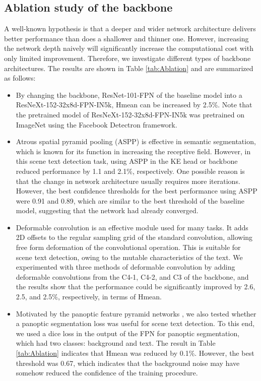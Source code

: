 \subsection{Ablation study of the backbone}
A well-known hypothesis is that a deeper and wider network architecture delivers better performance than does a shallower and thinner one. However, increasing the network depth naively will significantly increase the computational cost with only limited improvement. Therefore, we investigate different types
of backbone architectures. The results are shown in Table \ref{tab:Ablation} and are summarized as follows:
\begin{itemize}
  \item By changing the backbone, ResNet-101-FPN of the baseline model into a ResNeXt-152-32x8d-FPN-IN5k, Hmean can be increased by 2.5\%. Note that the pretrained model of ResNeXt-152-32x8d-FPN-IN5k was pretrained on ImageNet using the Facebook Detectron framework. 
  \item Atrous spatial pyramid pooling (ASPP) \cite{chen2017deeplab} is effective in semantic segmentation, which is known for its function in increasing the receptive field. However, in this scene text detection task, using ASPP in the KE head or backbone reduced  performance by 1.1 and 2.1\%, respectively. One possible reason is that the change in network architecture usually requires more iterations. However, the best confidence thresholds for the best performance using ASPP were 0.91 and 0.89, which are similar to the best threshold of the baseline model, suggesting that the network had already converged.
  \item Deformable convolution \cite{dai2017deformable} is an effective module used for many tasks. It adds 2D offsets to the regular sampling grid of the standard convolution, allowing free form deformation of the convolutional operation. This is suitable for scene text detection, owing to the mutable characteristics of the text. We experimented with three methods of deformable convolution by adding deformable convolutions from the C4-1, C4-2, and C3 of the backbone, and the results show that the performance could be significantly improved by 2.6, 2.5, and 2.5\%, respectively, in terms of Hmean.
  \item Motivated by the panoptic feature pyramid networks \cite{kirillov2019panoptic}, we also tested whether a panoptic segmentation loss was useful for scene text detection. To this end, we used a dice loss in the output of the FPN for panoptic segmentation, which had two classes: background and text. The result in Table \ref{tab:Ablation} indicates that Hmean was reduced by 0.1\%. However, the best threshold was 0.67, which indicates that the background noise may have somehow reduced the confidence of the training procedure.

\end{itemize}
